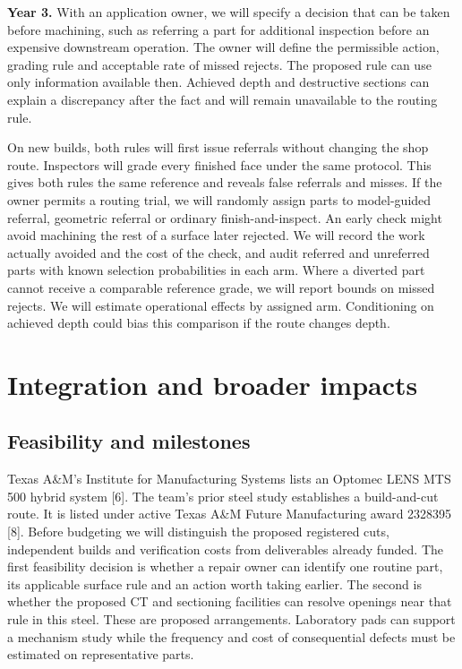\documentclass[11pt,letterpaper]{article}
\begin{document}
\textbf{Year 3.} With an application owner, we will specify a decision that can be taken before machining, such as referring a part for additional inspection before an expensive downstream operation. The owner will define the permissible action, grading rule and acceptable rate of missed rejects. The proposed rule can use only information available then. Achieved depth and destructive sections can explain a discrepancy after the fact and will remain unavailable to the routing rule.

On new builds, both rules will first issue referrals without changing the shop route. Inspectors will grade every finished face under the same protocol. This gives both rules the same reference and reveals false referrals and misses. If the owner permits a routing trial, we will randomly assign parts to model-guided referral, geometric referral or ordinary finish-and-inspect. An early check might avoid machining the rest of a surface later rejected. We will record the work actually avoided and the cost of the check, and audit referred and unreferred parts with known selection probabilities in each arm. Where a diverted part cannot receive a comparable reference grade, we will report bounds on missed rejects. We will estimate operational effects by assigned arm. Conditioning on achieved depth could bias this comparison if the route changes depth.

\newpage

\section*{Integration and broader impacts}

\subsection*{Feasibility and milestones}

Texas A\&M’s Institute for Manufacturing Systems lists an Optomec LENS MTS 500 hybrid system [6]. The team’s prior steel study establishes a build-and-cut route. It is listed under active Texas A\&M Future Manufacturing award 2328395 [8]. Before budgeting we will distinguish the proposed registered cuts, independent builds and verification costs from deliverables already funded. The first feasibility decision is whether a repair owner can identify one routine part, its applicable surface rule and an action worth taking earlier. The second is whether the proposed CT and sectioning facilities can resolve openings near that rule in this steel. These are proposed arrangements. Laboratory pads can support a mechanism study while the frequency and cost of consequential defects must be estimated on representative parts.
\end{document}
